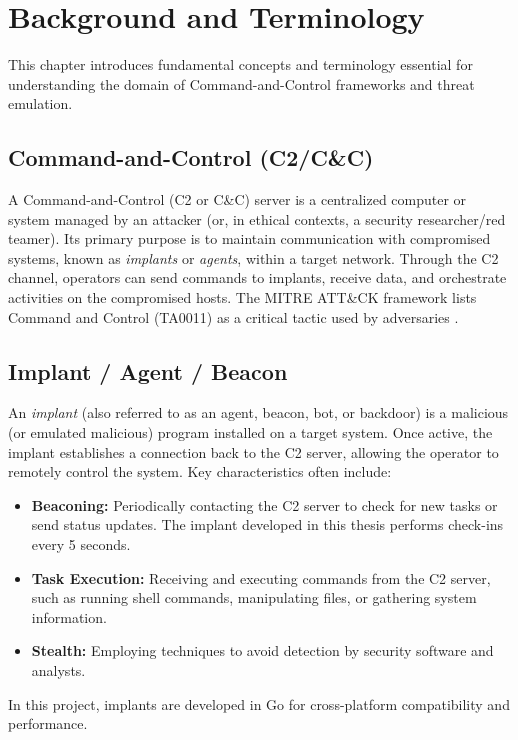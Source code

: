 \chapter{Background and Terminology}
\label{chap:background}

This chapter introduces fundamental concepts and terminology essential for understanding the domain of Command-and-Control frameworks and threat emulation.

\section{Command-and-Control (C2/C\&C)}
\label{sec:c2_definition}
A Command-and-Control (C2 or C\&C) server is a centralized computer or system managed by an attacker (or, in ethical contexts, a security researcher/red teamer). Its primary purpose is to maintain communication with compromised systems, known as \textit{implants} or \textit{agents}, within a target network. Through the C2 channel, operators can send commands to implants, receive data, and orchestrate activities on the compromised hosts. The MITRE ATT\&CK framework lists Command and Control (TA0011) as a critical tactic used by adversaries \cite{mitreATTACK_C2}.

\section{Implant / Agent / Beacon}
\label{sec:implant_definition}
An \textit{implant} (also referred to as an agent, beacon, bot, or backdoor) is a malicious (or emulated malicious) program installed on a target system. Once active, the implant establishes a connection back to the C2 server, allowing the operator to remotely control the system. Key characteristics often include:
\begin{itemize}
    \item \textbf{Beaconing:} Periodically contacting the C2 server to check for new tasks or send status updates. The implant developed in this thesis performs check-ins every 5 seconds.
    \item \textbf{Task Execution:} Receiving and executing commands from the C2 server, such as running shell commands, manipulating files, or gathering system information.
    \item \textbf{Stealth:} Employing techniques to avoid detection by security software and analysts.
\end{itemize}
In this project, implants are developed in Go for cross-platform compatibility and performance.

